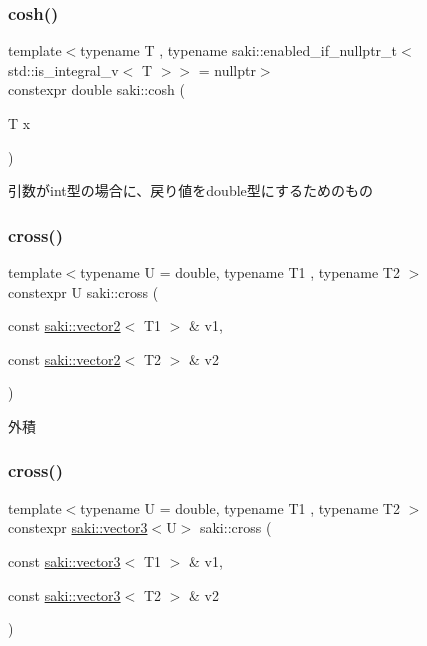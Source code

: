 \subsubsection{\texorpdfstring{cosh()}{cosh()}\hspace{0.1cm}{\footnotesize\ttfamily [2/2]}}
{\footnotesize\ttfamily template$<$typename T , typename saki\+::enabled\+\_\+if\+\_\+nullptr\+\_\+t$<$ std\+::is\+\_\+integral\+\_\+v$<$ T $>$$>$  = nullptr$>$ \\
constexpr double saki\+::cosh (\begin{DoxyParamCaption}\item[{T}]{x }\end{DoxyParamCaption})}



引数がint型の場合に、戻り値をdouble型にするためのもの 

\mbox{\label{namespacesaki_a457d78ffe360e1d8a78d14ec5dab38f2}} 
\subsubsection{\texorpdfstring{cross()}{cross()}\hspace{0.1cm}{\footnotesize\ttfamily [1/2]}}
{\footnotesize\ttfamily template$<$typename U  = double, typename T1 , typename T2 $>$ \\
constexpr U saki\+::cross (\begin{DoxyParamCaption}\item[{const \mbox{\hyperlink{classsaki_1_1vector2}{saki\+::vector2}}$<$ T1 $>$ \&}]{v1,  }\item[{const \mbox{\hyperlink{classsaki_1_1vector2}{saki\+::vector2}}$<$ T2 $>$ \&}]{v2 }\end{DoxyParamCaption})}



外積 

\mbox{\label{namespacesaki_a980242869d69e47ff8b10335e86ccf6f}} 
\subsubsection{\texorpdfstring{cross()}{cross()}\hspace{0.1cm}{\footnotesize\ttfamily [2/2]}}
{\footnotesize\ttfamily template$<$typename U  = double, typename T1 , typename T2 $>$ \\
constexpr \mbox{\hyperlink{classsaki_1_1vector3}{saki\+::vector3}}$<$U$>$ saki\+::cross (\begin{DoxyParamCaption}\item[{const \mbox{\hyperlink{classsaki_1_1vector3}{saki\+::vector3}}$<$ T1 $>$ \&}]{v1,  }\item[{const \mbox{\hyperlink{classsaki_1_1vector3}{saki\+::vector3}}$<$ T2 $>$ \&}]{v2 }\end{DoxyParamCaption})}



